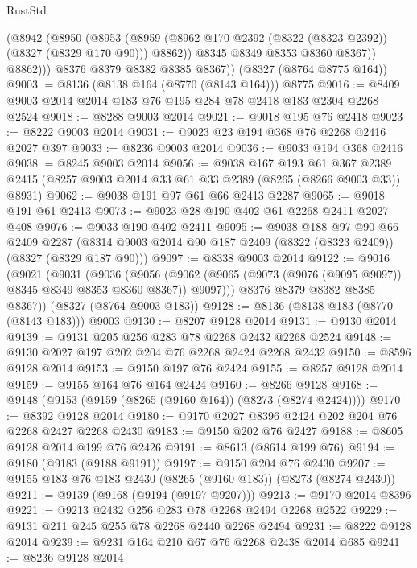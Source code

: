 \begin{lexlean}{RustStd}
\begin{coremodule}
{\begin{coremodule}
{{{{{{{{{{{{{{{{{{{{{{{{{{{{{{{{{{{{{{{{{{{{{{{{{{{{{{              (@8942
                (@8950
                  (@8953
                    (@8959 (@8962 @170 @2392 (@8322 (@8323 @2392)) (@8327 (@8329 @170 @90))) @8862))
                  @8345
                  @8349
                  @8353
                  @8360
                  @8367))
              @8862)))
        @8376
        @8379
        @8382
        @8385
        @8367))
    (@8327 (@8764 @8775 @164))
@9003 := @8136 (@8138 @164 (@8770 (@8143 @164))) @8775
@9016 := @8409 @9003 @2014 @2014 @183 @76 @195 @284 @78 @2418 @183 @2304 @2268 @2524
@9018 := @8288 @9003 @2014
@9021 := @9018 @195 @76 @2418
@9023 := @8222 @9003 @2014
@9031 := @9023 @23 @194 @368 @76 @2268 @2416 @2027 @397
@9033 := @8236 @9003 @2014
@9036 := @9033 @194 @368 @2416
@9038 := @8245 @9003 @2014
@9056 := @9038
    @167
    @193
    @61
    @367
    @2389
    @2415
    (@8257 @9003 @2014 @33 @61 @33 @2389 (@8265 (@8266 @9003 @33)) @8931)
@9062 := @9038 @191 @97 @61 @66 @2413 @2287
@9065 := @9018 @191 @61 @2413
@9073 := @9023 @28 @190 @402 @61 @2268 @2411 @2027 @408
@9076 := @9033 @190 @402 @2411
@9095 := @9038
    @188
    @97
    @90
    @66
    @2409
    @2287
    (@8314 @9003 @2014 @90 @187 @2409 (@8322 (@8323 @2409)) (@8327 (@8329 @187 @90)))
@9097 := @8338 @9003 @2014
@9122 := @9016
    (@9021
      (@9031
        (@9036
          (@9056 (@9062 (@9065 (@9073 (@9076 (@9095 @9097)) @8345 @8349 @8353 @8360 @8367)) @9097)))
        @8376
        @8379
        @8382
        @8385
        @8367))
    (@8327 (@8764 @9003 @183))
@9128 := @8136 (@8138 @183 (@8770 (@8143 @183))) @9003
@9130 := @8207 @9128 @2014
@9131 := @9130 @2014
@9139 := @9131 @205 @256 @283 @78 @2268 @2432 @2268 @2524
@9148 := @9130 @2027 @197 @202 @204 @76 @2268 @2424 @2268 @2432
@9150 := @8596 @9128 @2014
@9153 := @9150 @197 @76 @2424
@9155 := @8257 @9128 @2014
@9159 := @9155 @164 @76 @164 @2424
@9160 := @8266 @9128
@9168 := @9148 (@9153 (@9159 (@8265 (@9160 @164)) (@8273 (@8274 @2424))))
@9170 := @8392 @9128 @2014
@9180 := @9170 @2027 @8396 @2424 @202 @204 @76 @2268 @2427 @2268 @2430
@9183 := @9150 @202 @76 @2427
@9188 := @8605 @9128 @2014 @199 @76 @2426
@9191 := @8613 (@8614 @199 @76)
@9194 := @9180 (@9183 (@9188 @9191))
@9197 := @9150 @204 @76 @2430
@9207 := @9155 @183 @76 @183 @2430 (@8265 (@9160 @183)) (@8273 (@8274 @2430))
@9211 := @9139 (@9168 (@9194 (@9197 @9207)))
@9213 := @9170 @2014 @8396
@9221 := @9213 @2432 @256 @283 @78 @2268 @2494 @2268 @2522
@9229 := @9131 @211 @245 @255 @78 @2268 @2440 @2268 @2494
@9231 := @8222 @9128 @2014
@9239 := @9231 @164 @210 @67 @76 @2268 @2438 @2014 @685
@9241 := @8236 @9128 @2014
}}}}}}}}}}}}}}}}}}}}}}}}}}}}}}}}}}}}}}}}}}}}}}}}}}}}}}
\end{coremodule}}
\end{coremodule}
\end{lexlean}
